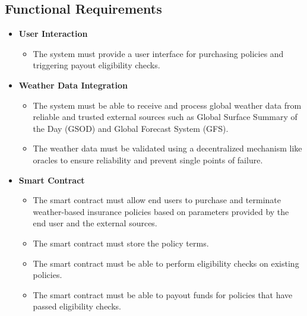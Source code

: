\subsection{Functional Requirements}\label{subsection:functionalRequirements}
\begin{itemize}
    \item \textbf{User Interaction}
    \begin{itemize}
        \item The system must provide a user interface for purchasing policies and triggering payout eligibility checks. 
    \end{itemize}

    \item \textbf{Weather Data Integration} 
    \begin{itemize}
        \item The system must be able to receive and process global weather data from reliable and trusted external sources such as Global Surface Summary of the Day (GSOD) and Global Forecast System (GFS).
        \item The weather data must be validated using a decentralized mechanism like oracles to ensure reliability and prevent single points of failure.
    \end{itemize}
    
    \item \textbf{Smart Contract}
    \begin{itemize}
        \item The smart contract must allow end users to purchase and terminate weather-based insurance policies based on parameters provided by the end user and the external sources.
        \item The smart contract must store the policy terms.
        \item The smart contract must be able to perform eligibility checks on existing policies.
        \item The smart contract must be able to payout funds for policies that have passed eligibility checks.
    \end{itemize}
\end{itemize}

